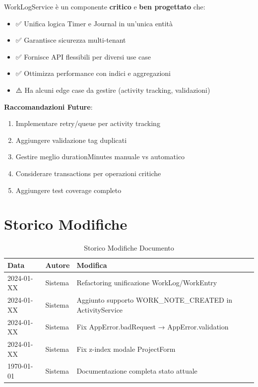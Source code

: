 \documentclass[11pt,a4paper]{article}
\begin{document}
WorkLogService è un componente \textbf{critico} e \textbf{ben progettato} che:

\begin{itemize}
    \item ✅ Unifica logica Timer e Journal in un'unica entità
    \item ✅ Garantisce sicurezza multi-tenant
    \item ✅ Fornisce API flessibili per diversi use case
    \item ✅ Ottimizza performance con indici e aggregazioni
    \item ⚠️ Ha alcuni edge case da gestire (activity tracking, validazioni)
\end{itemize}

\textbf{Raccomandazioni Future}:
\begin{enumerate}
    \item Implementare retry/queue per activity tracking
    \item Aggiungere validazione tag duplicati
    \item Gestire meglio durationMinutes manuale vs automatico
    \item Considerare transactions per operazioni critiche
    \item Aggiungere test coverage completo
\end{enumerate}

\section{Storico Modifiche}

\begin{table}[H]
\centering
\begin{tabular}{llp{8cm}}
\toprule
\textbf{Data} & \textbf{Autore} & \textbf{Modifica} \\
\midrule
2024-01-XX & Sistema & Refactoring unificazione WorkLog/WorkEntry \\
2024-01-XX & Sistema & Aggiunto supporto WORK\_NOTE\_CREATED in ActivityService \\
2024-01-XX & Sistema & Fix AppError.badRequest → AppError.validation \\
2024-01-XX & Sistema & Fix z-index modale ProjectForm \\
\today & Sistema & Documentazione completa stato attuale \\
\bottomrule
\end{tabular}
\caption{Storico Modifiche Documento}
\end{table}
\end{document}
